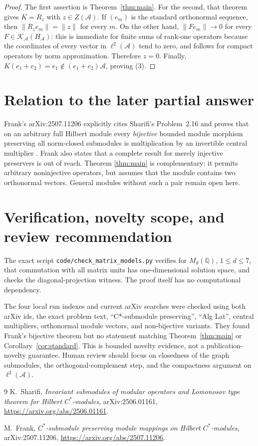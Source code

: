 \documentclass[11pt]{article}
\newcommand{\A}{\mathcal A}
\newcommand{\Kcomp}{\mathcal K}
\begin{document}
\begin{proof}
The first assertion is Theorem~\ref{thm:main}.  For the second, that theorem
gives $K=R_z$ with $z\in Z(\A)$.  If $(e_m)$ is the standard orthonormal
sequence, then $\|R_ze_m\|=\|z\|$ for every $m$.  On the other hand,
$\|Fe_m\|\to0$ for every $F\in\Kcomp_{\A}(H_{\A})$: this is immediate for
finite sums of rank-one operators because the coordinates of every vector in
$\ell^2(\A)$ tend to zero, and follows for compact operators by norm
approximation.  Therefore $z=0$.  Finally,
$K(e_1+e_2)=e_1\notin(e_1+e_2)\A$, proving (3).
\end{proof}

\section{Relation to the later partial answer}

Frank's arXiv:2507.11206 explicitly cites Sharifi's Problem~2.16 and proves
that on an arbitrary full Hilbert module every \emph{bijective} bounded module
morphism preserving all norm-closed submodules is multiplication by an
invertible central multiplier \cite[Thm.~1.2]{Frank}.  Frank also states that
a complete result for merely injective preservers is out of reach.  Theorem
\ref{thm:main} is complementary: it permits arbitrary noninjective operators,
but assumes that the module contains two orthonormal vectors.  General modules
without such a pair remain open here.

\section*{Verification, novelty scope, and review recommendation}

The exact script \texttt{code/check\_matrix\_models.py} verifies for
$M_d(\mathbb Q)$, $1\leq d\leq7$, that commutation with all matrix units has
one-dimensional solution space, and checks the diagonal-projection witness.
The proof itself has no computational dependency.

The four local run indexes and current arXiv searches were checked using both
arXiv ids, the exact problem text, ``C*-submodule preserving'', ``Alg Lat'',
central multipliers, orthonormal module vectors, and non-bijective variants.
They found Frank's bijective theorem but no statement matching
Theorem~\ref{thm:main} or Corollary~\ref{cor:standard}.  This is bounded
novelty evidence, not a publication-novelty guarantee.  Human review should
focus on closedness of the graph submodules, the orthogonal-complement step,
and the compactness argument on $\ell^2(\A)$.

\begin{thebibliography}{9}
K.~Sharifi,
\emph{Invariant submodules of modular operators and Lomonosov type theorem
for Hilbert $C^*$-modules}, arXiv:2506.01161,
\url{https://arxiv.org/abs/2506.01161}.

M.~Frank,
\emph{$C^*$-submodule preserving module mappings on Hilbert $C^*$-modules},
arXiv:2507.11206,
\url{https://arxiv.org/abs/2507.11206}.
\end{thebibliography}
\end{document}

